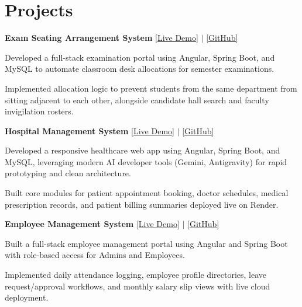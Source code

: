 \documentclass[letterpaper,10pt]{article}
\begin{document}
\section{Projects}
\begin{resumelist}
  \item \textbf{Exam Seating Arrangement System} \hfill \href{https://student-exam-seating-arrangement.onrender.com/}{[Live Demo]} $|$ \href{https://github.com/Lokesh3454/Student_Exam_Seating_Arrangement}{[GitHub]}
  \begin{resumelist}
    \item Developed a full-stack examination portal using Angular, Spring Boot, and MySQL to automate classroom desk allocations for semester examinations.
    \item Implemented allocation logic to prevent students from the same department from sitting adjacent to each other, alongside candidate hall search and faculty invigilation rosters.
  \end{resumelist}

  \item \textbf{Hospital Management System} \hfill \href{https://hospital-management-system-fbmw.onrender.com/}{[Live Demo]} $|$ \href{https://github.com/Lokesh3454/Hospital_Management_System}{[GitHub]}
  \begin{resumelist}
    \item Developed a responsive healthcare web app using Angular, Spring Boot, and MySQL, leveraging modern AI developer tools (Gemini, Antigravity) for rapid prototyping and clean architecture.
    \item Built core modules for patient appointment booking, doctor schedules, medical prescription records, and patient billing summaries deployed live on Render.
  \end{resumelist}

  \item \textbf{Employee Management System} \hfill \href{https://ems-portal-gmw6.onrender.com/}{[Live Demo]} $|$ \href{https://github.com/Lokesh3454/EMS-Portal-}{[GitHub]}
  \begin{resumelist}
    \item Built a full-stack employee management portal using Angular and Spring Boot with role-based access for Admins and Employees.
    \item Implemented daily attendance logging, employee profile directories, leave request/approval workflows, and monthly salary slip views with live cloud deployment.
  \end{resumelist}
\end{resumelist}
\end{document}

